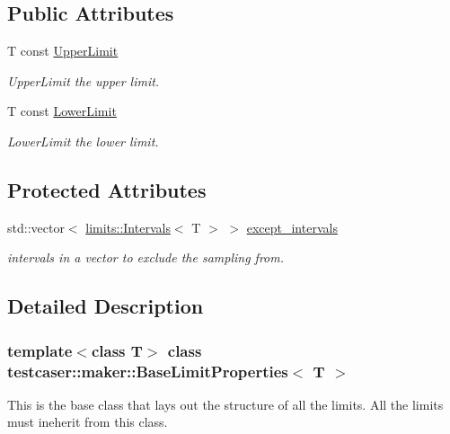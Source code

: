\subsection*{Public Attributes}
\begin{DoxyCompactItemize}
\item 
T const \mbox{\hyperlink{classtestcaser_1_1maker_1_1BaseLimitProperties_a26f4a88b77b97786c53a431454ff078a}{Upper\+Limit}}
\begin{DoxyCompactList}\small\item\em Upper\+Limit the upper limit. \end{DoxyCompactList}\item 
T const \mbox{\hyperlink{classtestcaser_1_1maker_1_1BaseLimitProperties_a074bc1b980f1cce9d944a01964b13b70}{Lower\+Limit}}
\begin{DoxyCompactList}\small\item\em Lower\+Limit the lower limit. \end{DoxyCompactList}\end{DoxyCompactItemize}
\subsection*{Protected Attributes}
\begin{DoxyCompactItemize}
\item 
std\+::vector$<$ \mbox{\hyperlink{structtestcaser_1_1maker_1_1limits_1_1Intervals}{limits\+::\+Intervals}}$<$ T $>$ $>$ \mbox{\hyperlink{classtestcaser_1_1maker_1_1BaseLimitProperties_a5480f2303023b81cc0199eb1f0ba94cd}{except\+\_\+intervals}}
\begin{DoxyCompactList}\small\item\em intervals in a vector to exclude the sampling from. \end{DoxyCompactList}\end{DoxyCompactItemize}


\subsection{Detailed Description}
\subsubsection*{template$<$class T$>$\newline
class testcaser\+::maker\+::\+Base\+Limit\+Properties$<$ T $>$}

This is the base class that lays out the structure of all the limits. All the limits must ineherit from this class. 


